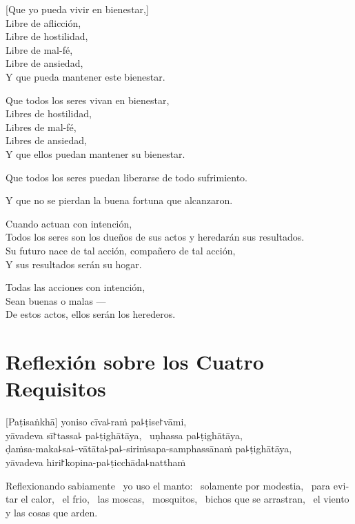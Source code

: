[Que yo pueda vivir en bienestar,]\\
Libre de aflicción,\\
Libre de hostilidad,\\
Libre de mal-fé,\\
Libre de ansiedad,\\
Y que pueda mantener este bienestar.

Que todos los seres vivan en bienestar,\\
Libres de hostilidad,\\
Libres de mal-fé,\\
Libres de ansiedad,\\
Y que ellos puedan mantener su bienestar.

Que todos los seres puedan liberarse de todo sufrimiento.

Y que no se pierdan la buena fortuna que alcanzaron.

Cuando actuan con intención,\\
Todos los seres son los dueños de sus actos y heredarán sus resultados.\\
Su futuro nace de tal acción, compañero de tal acción,\\
Y sus resultados serán su hogar.

Todas las acciones con intención,\\
Sean buenas o malas ---\\
De estos actos, ellos serán los herederos.

\chapter[Cuatro Requisitos]{Reflexión sobre los Cuatro Requisitos}


\begin{leader}
\end{leader}

[Paṭisaṅkhā] yoniso cīva꜕raṁ pa꜕ṭise꜓vāmi, \pause\\
yāvadeva sī꜓tassa꜕ pa꜕ṭighātāya, \pause\ uṇhassa pa꜕ṭighātāya, \pause\\
ḍaṁsa-maka꜕sa꜕-vātāta꜕pa꜕-siriṁsapa-samphassānaṁ pa꜕ṭighātāya, \pause\\
yāvadeva hiri꜓kopina-pa꜕ṭicchāda꜕natthaṁ

\begin{english}
  Reflexionando sabiamente \pause\ yo uso el manto: \pause\ solamente por modestia, \pause\
  para evitar el calor, \pause\ el frio, \pause\ las moscas, \pause\ mosquitos,
  \pause\ bichos que se arrastran, \pause\ el viento y las cosas que arden.
\end{english}

